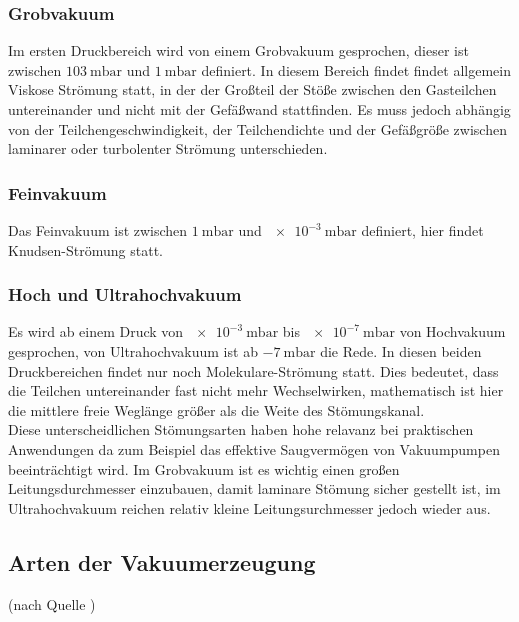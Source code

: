 		\subsubsection{Grobvakuum}
			\noindent
			Im ersten Druckbereich wird von einem Grobvakuum gesprochen, dieser ist zwischen $\SI{103}{\milli\bar}$ und $\SI{1}{\milli\bar}$ definiert.
			In diesem Bereich findet findet allgemein Viskose Strömung statt, in der der Großteil der Stöße zwischen den Gasteilchen untereinander und nicht mit der Gefäßwand stattfinden.
			Es muss jedoch abhängig von der Teilchengeschwindigkeit, der Teilchendichte und der Gefäßgröße zwischen laminarer oder turbolenter Strömung unterschieden. 

		\subsubsection{Feinvakuum}

			\noindent
			Das Feinvakuum ist zwischen $\SI{1}{\milli\bar}$ und $\SI{e-3}{\milli\bar}$ definiert, hier findet Knudsen-Strömung statt.

			\noindent
		\subsubsection{Hoch und Ultrahochvakuum} 
			Es wird ab einem Druck von $\SI{e-3}{\milli\bar}$ bis $\SI{e-7}{\milli\bar}$ von Hochvakuum gesprochen, von Ultrahochvakuum ist ab $\SI{-7}{\milli\bar}$ die Rede.		
			In diesen beiden Druckbereichen findet nur noch Molekulare-Strömung statt.
			Dies bedeutet, dass die Teilchen untereinander fast nicht mehr Wechselwirken, mathematisch ist hier die mittlere freie Weglänge größer als die Weite des Stömungskanal.
		\\
		Diese unterscheidlichen Stömungsarten haben hohe relavanz bei praktischen Anwendungen da zum Beispiel das effektive Saugvermögen von Vakuumpumpen beeinträchtigt wird.
		Im Grobvakuum ist es wichtig einen großen Leitungsdurchmesser einzubauen, damit laminare Stömung sicher gestellt ist,
		im Ultrahochvakuum reichen relativ kleine Leitungsurchmesser jedoch wieder aus.

	\subsection{Arten der Vakuumerzeugung}(nach Quelle \cite{peiffer})
		
